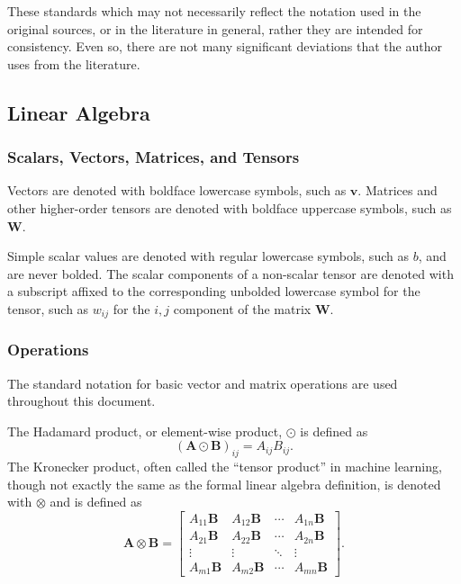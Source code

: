 \documentclass[12pt]{report}
\theoremstyle{definition}
\theoremstyle{remark}
\begin{document}
These standards which may not necessarily reflect the notation used in the original sources, or in the literature in general, rather they are intended for consistency. Even so, there are not many significant deviations that the author uses from the literature.

\subsection{Linear Algebra}
\subsubsection{Scalars, Vectors, Matrices, and Tensors}
Vectors are denoted with boldface lowercase symbols, such as $\mathbf{v}$. Matrices and other higher-order tensors are denoted with boldface uppercase symbols, such as $\mathbf{W}$.

Simple scalar values are denoted with regular lowercase symbols, such as $b$, and are never bolded. The scalar components of a non-scalar tensor are denoted with a subscript affixed to the corresponding unbolded lowercase symbol for the tensor, such as $w_{ij}$ for the $i,j$ component of the matrix $\mathbf{W}$.

\subsubsection{Operations} %
The standard notation for basic vector and matrix operations are used throughout this document.

The Hadamard product, or element-wise product, $\odot$ is defined as
\begin{equation}
    ({\mathbf{A} \odot \mathbf{B}})_{ij} = A_{ij}B_{ij}.
\end{equation}
The Kronecker product, often called the ``tensor product'' in machine learning, though not exactly the same as the formal linear algebra definition, is denoted with $\otimes$ and is defined as
\begin{equation}
    \mathbf{A} \otimes \mathbf{B} = \begin{bmatrix}
        A_{11}\mathbf{B} & A_{12}\mathbf{B} & \cdots & A_{1n}\mathbf{B} \\
        A_{21}\mathbf{B} & A_{22}\mathbf{B} & \cdots & A_{2n}\mathbf{B} \\
        \vdots & \vdots & \ddots & \vdots \\
        A_{m1}\mathbf{B} & A_{m2}\mathbf{B} & \cdots & A_{mn}\mathbf{B}
    \end{bmatrix}.
\end{equation}
\end{document}
